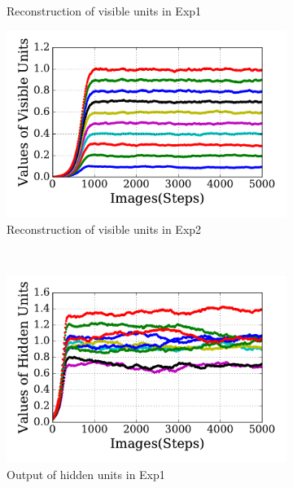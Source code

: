 \begin{figure}
\begin{subfigure}[t]{0.48\textwidth}
		\caption{Reconstruction of visible units in Exp1}
	\end{subfigure}
	\begin{subfigure}[t]{0.48\textwidth}
		\includegraphics[width=\textwidth]{pics_sdlm/30_exp_RBM/exp2_recon_non.pdf}
		\caption{Reconstruction of visible units in Exp2}
	\end{subfigure}\\
	\begin{subfigure}[t]{0.48\textwidth}
		\includegraphics[width=\textwidth]{pics_sdlm/30_exp_RBM/exp1_hid_non.pdf}
		\caption{Output of hidden units in Exp1}
	\end{subfigure}
	\begin{subfigure}[t]{0.48\textwidth}

\end{subfigure}
\end{figure}
